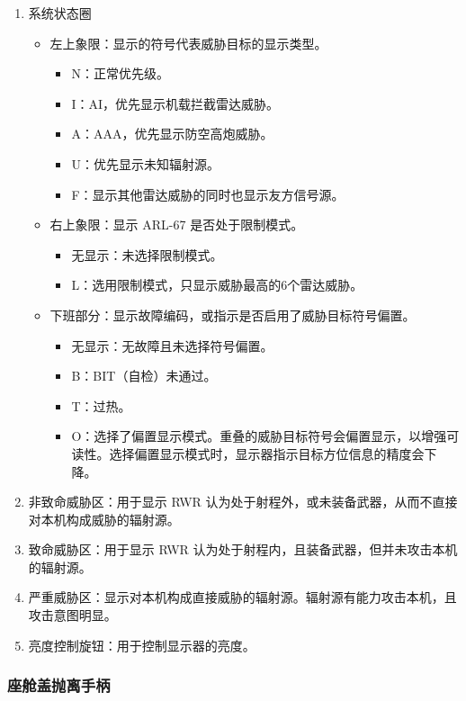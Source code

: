 \begin{enumerate}
  \item 系统状态圈
  \begin{itemize}
    \item 左上象限：显示的符号代表威胁目标的显示类型。
    \begin{itemize}
      \item N：正常优先级。
      \item I：AI，优先显示机载拦截雷达威胁。
      \item A：AAA，优先显示防空高炮威胁。
      \item U：优先显示未知辐射源。
      \item F：显示其他雷达威胁的同时也显示友方信号源。
    \end{itemize}
    \item 右上象限：显示 ARL-67 是否处于限制模式。
    \begin{itemize}
      \item 无显示：未选择限制模式。
      \item L：选用限制模式，只显示威胁最高的6个雷达威胁。
    \end{itemize}
    \item 下班部分：显示故障编码，或指示是否启用了威胁目标符号偏置。
    \begin{itemize}
      \item 无显示：无故障且未选择符号偏置。
      \item B：BIT（自检）未通过。
      \item T：过热。
      \item O：选择了偏置显示模式。重叠的威胁目标符号会偏置显示，以增强可读性。选择偏置显示模式时，显示器指示目标方位信息的精度会下降。
    \end{itemize}
  \end{itemize}
  \item 非致命威胁区：用于显示 RWR 认为处于射程外，或未装备武器，从而不直接对本机构成威胁的辐射源。
  \item 致命威胁区：用于显示 RWR 认为处于射程内，且装备武器，但并未攻击本机的辐射源。
  \item 严重威胁区：显示对本机构成直接威胁的辐射源。辐射源有能力攻击本机，且攻击意图明显。
  \item 亮度控制旋钮：用于控制显示器的亮度。
\end{enumerate}

\subsubsection{座舱盖抛离手柄}

